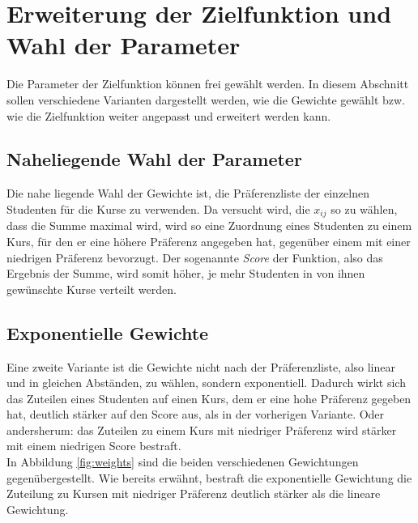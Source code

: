     \section{Erweiterung der Zielfunktion und Wahl der Parameter}
        Die Parameter der Zielfunktion können frei gewählt werden.
        In diesem Abschnitt sollen verschiedene Varianten dargestellt werden, wie die Gewichte gewählt bzw. wie die Zielfunktion weiter angepasst und erweitert werden kann.
        
        \subsection{Naheliegende Wahl der Parameter}
            Die nahe liegende Wahl der Gewichte ist, die Präferenzliste der einzelnen Studenten für die Kurse zu verwenden.
            Da versucht wird, die $ x_{ij} $ so zu wählen, dass die Summe maximal wird, wird so eine Zuordnung eines Studenten zu einem Kurs, für den er eine höhere Präferenz angegeben hat, gegenüber einem mit einer niedrigen Präferenz bevorzugt.
            Der sogenannte \textit{Score} der Funktion, also das Ergebnis der Summe, wird somit höher, je mehr Studenten in von ihnen gewünschte Kurse verteilt werden.
            
        \subsection{Exponentielle Gewichte}
            Eine zweite Variante ist die Gewichte nicht nach der Präferenzliste, also linear und in gleichen Abständen, zu wählen, sondern exponentiell.
            Dadurch wirkt sich das Zuteilen eines Studenten auf einen Kurs, dem er eine hohe Präferenz gegeben hat, deutlich stärker auf den Score aus, als in der vorherigen Variante.
            Oder andersherum: das Zuteilen zu einem Kurs mit niedriger Präferenz wird stärker mit einem niedrigen Score bestraft.\\
            
            In Abbildung \ref{fig:weights} sind die beiden verschiedenen Gewichtungen gegenübergestellt.
            Wie bereits erwähnt, bestraft die exponentielle Gewichtung die Zuteilung zu Kursen mit niedriger Präferenz deutlich stärker als die lineare Gewichtung.
            
